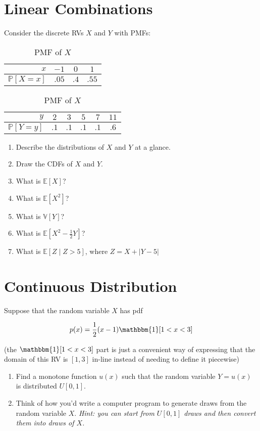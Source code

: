 \documentclass{article}
\begin{document}
\section{Linear Combinations}

Consider the discrete RVs $X$ and $Y$ with PMFs:

\begin{table}[htbp]
\centering
\begin{tabular}{r|ccc}
$x$ & $-1$ & $0$ & $1$ \\
\hline
$\mathbb{P}[X = x]$ & $.05$ & $.4$ & $.55$ \\
\end{tabular}
\caption{PMF of $X$}
\label{tbl:x_dist}
\end{table}

\begin{table}[htbp]
\centering
\begin{tabular}{r|ccccc}
$y$ & $2$ & $3$ & $5$ & $7$ & $11$ \\
\hline
$\mathbb{P}[Y = y]$ & $.1$ & $.1$ & $.1$ & $.1$ & $.6$ \\
\end{tabular}
\caption{PMF of $X$}
\label{tbl:y_dist}
\end{table}

\begin{enumerate}
\item Describe the distributions of $X$ and $Y$ at a glance.
\item Draw the CDFs of $X$ and $Y$.
\item What is $\mathbb{E}[X]$?
\item What is $\mathbb{E}[X^2]$?
\item What is $\mathbb{V}[Y]$?
\item What is $\mathbb{E}[X^2 - \frac12 Y]$?
\item What is $\mathbb{E}[Z \mid Z > 5]$, where $Z = X + |Y - 5|$
\end{enumerate}

\section{Continuous Distribution}

Suppose that the random variable $X$ has pdf

\[ p(x) = \frac12 (x - 1) \mathbbm{1}[1 < x < 3] \]

(the $\mathbbm{1}[1 < x < 3]$ part is just a convenient way of expressing that the domain of this RV is $[1, 3]$ in-line instead of needing to define it piecewise)

\begin{enumerate}
\item Find a monotone function $u(x)$ such that the random variable $Y = u(x)$ is distributed $U[0,1]$.
\item Think of how you'd write a computer program to generate draws from the random variable $X$. \textit{Hint: you can start from $U[0, 1]$ draws and then convert them into draws of $X$.} 
\end{enumerate}
\end{document}
